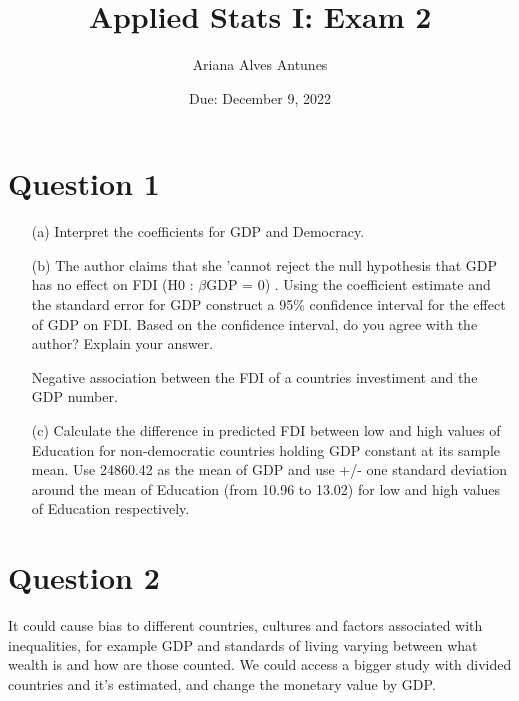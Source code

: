\documentclass[12pt,letterpaper]{article}
\title{Applied Stats I: Exam 2 }
\date{Due: December 9, 2022}
\author{Ariana Alves Antunes}
\begin{document}
	\maketitle

	\vspace{.5cm}
\section*{Question 1}
\vspace{.5cm}
\begin{enumerate}

	\item [(a)] Interpret the coefficients for GDP and Democracy.
	  	
	
	
	
	\item [(b)]The author claims that she ’cannot reject the null hypothesis that GDP has no effect on FDI (H0 : $\beta$GDP = 0) . Using the coefficient estimate and the standard error for GDP construct a 95\% confidence interval for the effect of GDP on FDI. Based on the confidence interval, do you agree with the author? Explain your answer.
	
		  	
		
		Negative association between the FDI of a countries investiment and the GDP number. 
	
	\item [(c)] Calculate the difference in predicted FDI between low and high values of Education for non-democratic countries holding GDP constant at its sample mean. Use 24860.42 as the mean of GDP and use +/- one standard deviation around the mean of Education
	(from 10.96 to 13.02) for low and high values of Education respectively.
	
		  	
		
\end{enumerate}


\section*{Question 2}
\vspace{.5cm}

It could cause bias to different countries, cultures and  factors associated with inequalities, for example GDP and 
standards of living varying between what wealth is and how are those counted. 
We could access a bigger study with divided countries and it's estimated, and change the monetary value by GDP. 
\end{document}
